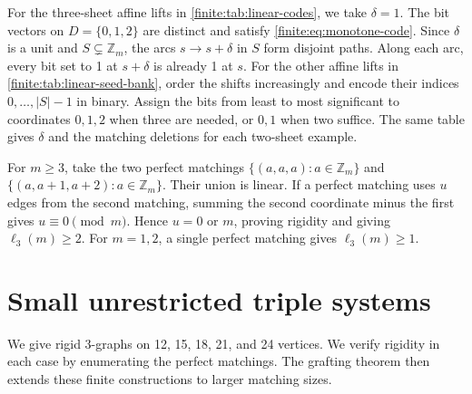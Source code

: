\documentclass[10pt]{article}
\numberwithin{equation}{section}
\begin{document}
For the three-sheet affine lifts in \cref{finite:tab:linear-codes}, we take $\delta=1$. The bit vectors on $D=\{0,1,2\}$ are distinct and satisfy \cref{finite:eq:monotone-code}. Since $\delta$ is a unit and $S\subsetneq\mathbb Z_m$, the arcs $s\to s+\delta$ in $S$ form disjoint paths. Along each arc, every bit set to 1 at $s+\delta$ is already 1 at $s$. For the other affine lifts in \cref{finite:tab:linear-seed-bank}, order the shifts increasingly and encode their indices $0,\ldots,|S|-1$ in binary. Assign the bits from least to most significant to coordinates $0,1,2$ when three are needed, or $0,1$ when two suffice. The same table gives $\delta$ and the matching deletions for each two-sheet example.

For $m\ge3$, take the two perfect matchings $\{(a,a,a)\colon a\in\mathbb Z_m\}$ and $\{(a,a+1,a+2)\colon a\in\mathbb Z_m\}$. Their union is linear. If a perfect matching uses $u$ edges from the second matching, summing the second coordinate minus the first gives $u\equiv0\pmod m$. Hence $u=0$ or $m$, proving rigidity and giving $\ell_3(m)\ge2$. For $m=1,2$, a single perfect matching gives $\ell_3(m)\ge1$.

\section{Small unrestricted triple systems}\label{finite:sec:finite-inputs}
We give rigid $3$-graphs on 12, 15, 18, 21, and 24 vertices. We verify rigidity in each case by enumerating the perfect matchings. The grafting theorem then extends these finite constructions to larger matching sizes.
\end{document}
